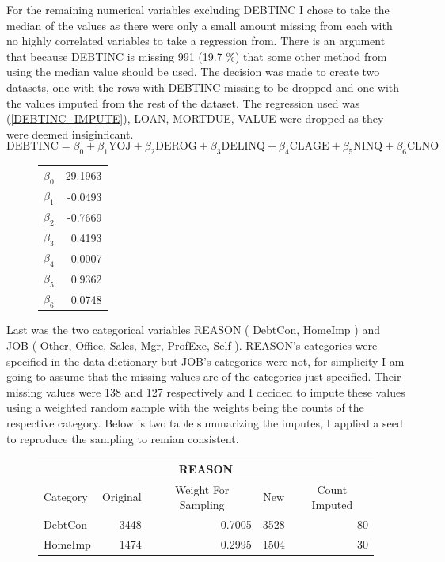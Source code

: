 For the remaining numerical variables excluding DEBTINC I chose to take the median of the values as there were only a small amount missing from each with no highly correlated variables to take a regression from. There is an argument that because DEBTINC is missing 991 (19.7 \%) that some other method from using the median value should be used. The decision was made to create two datasets, one with the rows with DEBTINC missing to be dropped and one with the values imputed from the rest of the dataset. The regression used was (\ref{DEBTINC_IMPUTE}), LOAN, MORTDUE, VALUE were dropped as they were deemed insiginficant. \\

\begin{equation}\label{DEBTINC_IMPUTE}
\text{DEBTINC} = \beta_{0} + \beta_{1}\text{YOJ} + \beta_{2}\text{DEROG} + \beta_{3}\text{DELINQ}  + \beta_{4}\text{CLAGE}  + \beta_{5}\text{NINQ}  + \beta_{6}\text{CLNO}
\end{equation}

\begin{figure}[ht]\label{DEBTINC_IMPUTE_COEFS}
	\centering
	\begin{tabular}{lr}
	\hline
	$\beta_{0}$   &  29.1963 \\
	$\beta_{1}$     &  -0.0493 \\
	$\beta_{2}$   &  -0.7669 \\
	$\beta_{3}$  &   0.4193 \\
	$\beta_{4}$   &   0.0007 \\
	$\beta_{5}$    &   0.9362 \\
	$\beta_{6}$    &   0.0748 \\
	\bottomrule
	\end{tabular}
\end{figure}

Last was the two categorical variables REASON ( DebtCon, HomeImp ) and JOB ( Other, Office, Sales, Mgr, ProfExe, Self ). REASON's categories were specified in the data dictionary but JOB's categories were not, for simplicity I am going to assume that the missing values are of the categories just specified. Their missing values were 138 and 127 respectively and I decided to impute these values using a weighted random sample with the weights being the counts of the respective category. Below is two table summarizing the imputes, I applied a seed to reproduce the sampling to remian consistent.

\begin{figure}[ht]\label{REASON_IMPUTES}
	\centering
	\renewcommand{\arraystretch}{1.25}
	\begin{tabular}{lrrrr}
	\multicolumn{5}{c}{REASON}\\
	\hline
	Category & \multicolumn{1}{c}{Original} & \multicolumn{1}{c}{Weight For Sampling} & \multicolumn{1}{c}{New} & \multicolumn{1}{c}{Count Imputed} \\ 
	\hline
	DebtCon & 3448 & 0.7005 & 3528 & 80\\
	HomeImp & 1474 & 0.2995 & 1504  & 30\\
	\end{tabular}
\end{figure}

